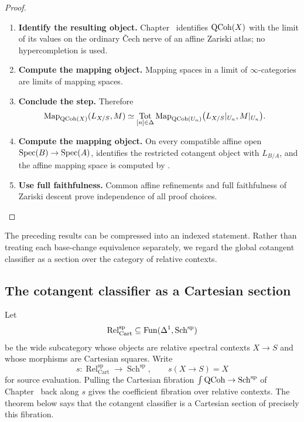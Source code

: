 \begin{proof}
\leavevmode
\begin{enumerate}[label=\textup{(\arabic*)}]
    \item \textbf{Identify the resulting object.}
    Chapter~ identifies \(\operatorname{QCoh}(X)\) with the limit of its
    values on the ordinary \v{C}ech nerve of an affine Zariski atlas; no hypercompletion is
    used.

    \item \textbf{Compute the mapping object.}
    Mapping spaces in a limit of \(\infty\)-categories are limits of mapping spaces.

    \item \textbf{Conclude the step.}
    Therefore
    \[
    \begin{aligned}
        \operatorname{Map}_{\operatorname{QCoh}(X)}(L_{X/S},M)
        &\simeq
        \operatorname*{Tot}_{[n]\in\Delta}
        \operatorname{Map}_{\operatorname{QCoh}(U_n)}
        \bigl(L_{X/S}|_{U_n},M|_{U_n}\bigr).
    \end{aligned}
    \]

    \item \textbf{Compute the mapping object.}
    On every compatible affine open \(\operatorname{Spec}(B)\to\operatorname{Spec}(A)\), 
    identifies the restricted cotangent object with \(L_{B/A}\), and the affine mapping space is
    computed by .

    \item \textbf{Use full faithfulness.}
    Common affine refinements and full faithfulness of Zariski descent prove independence of all
    proof choices.
\end{enumerate}
\end{proof}
The preceding results can be compressed into an indexed statement. Rather
than treating each base-change equivalence separately, we regard the global
cotangent classifier as a section over the category of relative contexts.

\subsection{The cotangent classifier as a Cartesian section}

Let
\[
    \operatorname{Rel}^{\mathrm{sp}}_{\mathrm{Cart}}
    \subseteq
    \operatorname{Fun}(\Delta^1,\operatorname{Sch}^{\mathrm{sp}})
\]
be the wide subcategory whose objects are relative spectral contexts
\(X\to S\) and whose morphisms are Cartesian squares. Write
\[
    s:\operatorname{Rel}^{\mathrm{sp}}_{\mathrm{Cart}}
    \longrightarrow
    \operatorname{Sch}^{\mathrm{sp}},
    \qquad
    s(X\to S)=X
\]
for source evaluation. Pulling the Cartesian fibration
\(\int\operatorname{QCoh}\to\operatorname{Sch}^{\mathrm{sp}}\) of
Chapter~ back along \(s\) gives the
coefficient fibration over relative contexts. The theorem below says that the
cotangent classifier is a Cartesian section of precisely this fibration.


